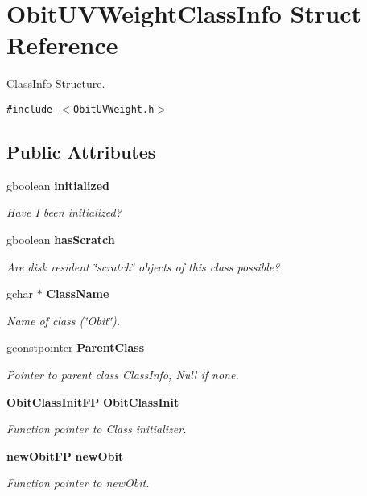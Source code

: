 \section{Obit\-UVWeight\-Class\-Info Struct Reference}
\label{structObitUVWeightClassInfo}
Class\-Info Structure.  


{\tt \#include $<$Obit\-UVWeight.h$>$}

\subsection*{Public Attributes}
\begin{CompactItemize}
\item 
gboolean {\bf initialized}
\begin{CompactList}\small\item\em Have I been initialized? \item\end{CompactList}\item 
gboolean {\bf has\-Scratch}
\begin{CompactList}\small\item\em Are disk resident \char`\"{}scratch\char`\"{} objects of this class possible? \item\end{CompactList}\item 
gchar $\ast$ {\bf Class\-Name}
\begin{CompactList}\small\item\em Name of class (\char`\"{}Obit\char`\"{}). \item\end{CompactList}\item 
gconstpointer {\bf Parent\-Class}
\begin{CompactList}\small\item\em Pointer to parent class Class\-Info, Null if none. \item\end{CompactList}\item 
{\bf Obit\-Class\-Init\-FP} {\bf Obit\-Class\-Init}
\begin{CompactList}\small\item\em Function pointer to Class initializer. \item\end{CompactList}\item 
{\bf new\-Obit\-FP} {\bf new\-Obit}
\begin{CompactList}\small\item\em Function pointer to new\-Obit. \item\end{CompactList}\item 

\end{CompactItemize}
